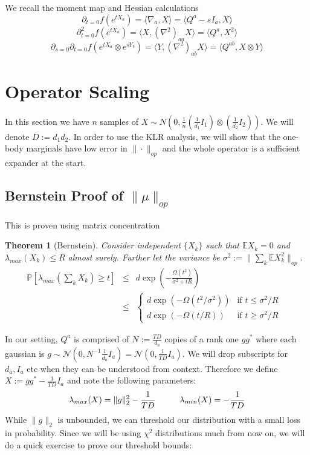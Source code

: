 \documentclass{article}
\newtheorem{theorem}{Theorem}
\newcommand{\E}{\mathbb{E}}
\renewcommand{\Pr}{\mathbb{P}}
\begin{document}
We recall the moment map and Hessian calculations
\[ \partial_{t=0} f(e^{tX_{a}}) = \langle \nabla_{a}, X \rangle = \langle Q^{a} - sI_{a}, X \rangle   \]
\[ \partial_{t=0}^{2} f(e^{tX_{a}}) = \langle X, (\nabla^{2})_{aa} X \rangle = \langle Q^{a}, X^{2} \rangle  \]
\[ \partial_{s=0} \partial_{t=0} f(e^{tX_{a}} \otimes e^{sY_{b}}) = \langle Y, (\nabla^{2})_{ab} X \rangle = \langle Q^{ab}, X \otimes Y \rangle   \]

\section{Operator Scaling}
In this section we have $n$ samples of $X \sim N(0,\frac{1}{n} (\frac{1}{d_{1}} I_{1}) \otimes (\frac{1}{d_{2}} I_{2}))$. We will denote $D := d_{1} d_{2}$. In order to use the KLR analysis, we will show that the one-body marginals have low error in $\|\cdot\|_{op}$ and the whole operator is a sufficient expander at the start. 

\subsection{Bernstein Proof of $\|\mu\|_{op}$}
This is proven using matrix concentration

\begin{theorem} [Bernstein]
Consider independent $\{X_{k}\}$ such that $\E X_{k} = 0$ and $\lambda_{max}(X_{k}) \leq R$ almost surely. Further let the variance be $\sigma^{2} := \|\sum_{k} \E X_{k}^{2} \|_{op}$. 
\begin{eqnarray*} \Pr [ \lambda_{max} \left( \sum_{k} X_{k}  \right) \geq t ] & \leq & d \exp\left( - \frac{\Omega(t^{2})}{\sigma^{2} + t R} \right)
\\ & \leq & \begin{cases} 
d \exp ( - \Omega(t^{2}/\sigma^{2}) ) & \text{if $t \leq \sigma^{2}/R$ } 
\\ d \exp ( - \Omega(t/R) )           & \text{if $t \geq \sigma^{2}/R$}
\end{cases} 
\end{eqnarray*}
\end{theorem}

In our setting, $Q^{a}$ is comprised of $N := \frac{TD}{d_{a}}$ copies of a rank one $g g^{*}$ where each gaussian is $g \sim \mathcal{N}(0, N^{-1} \frac{1}{d_{a}} I_{a} ) = \mathcal{N}(0, \frac{1}{TD} I_{a}) $. We will drop subscripts for $d_{a}, I_{a}$ etc when they can be understood from context. Therefore we define $X := g g^{*} - \frac{1}{TD} I_{a}$ and note the following parameters:
\[ \lambda_{max}(X) = \|g\|_{2}^{2} - \frac{1}{TD} \hspace{10mm} \lambda_{min}(X) = - \frac{1}{TD}   \]
While $\|g\|_{2}$ is unbounded, we can threshold our distribution with a small loss in probability. Since we will be using $\chi^{2}$ distributions much from now on, we will do a quick exercise to prove our threshold bounds:
\end{document}
